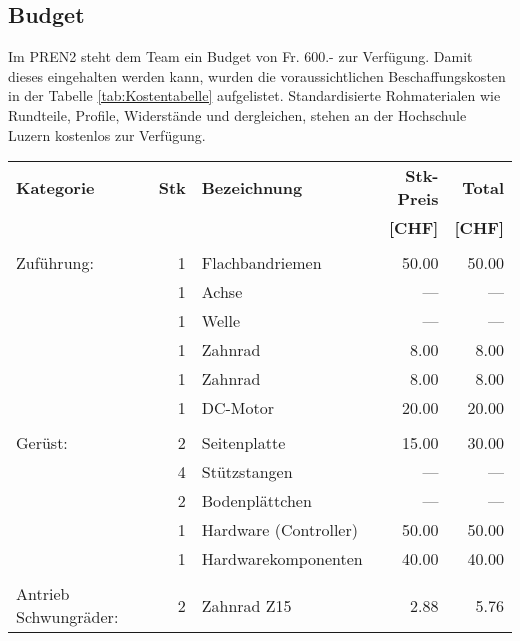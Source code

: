 \subsection{Budget}
    Im PREN2 steht dem Team ein Budget von Fr. 600.- zur Verfügung. Damit 
    dieses eingehalten werden kann, wurden die voraussichtlichen 
    Beschaffungskosten in der Tabelle \ref{tab:Kostentabelle} aufgelistet. 
    Standardisierte Rohmaterialen wie Rundteile, Profile, Widerstände und 
    dergleichen, stehen an der Hochschule Luzern kostenlos zur Verfügung.
    \begin{longtable}{p{1.7cm}rlrr}
    \textbf{Kategorie} & \textbf{Stk} & \textbf{Bezeichnung} & \textbf{Stk-Preis}
    & \textbf{Total} \\ & & & \textbf{[CHF]} & \textbf{[CHF]} \\       
    \hline     &       &                              &        &        \\
    Zuführung: & 1     & Flachbandriemen              &  50.00 &  50.00 \\
               & 1     & Achse                        &  {---} &  {---} \\
               & 1     & Welle                        &  {---} &  {---} \\
               & 1     & Zahnrad                      &   8.00 &   8.00 \\
               & 1     & Zahnrad                      &   8.00 &   8.00 \\
               & 1     & DC-Motor                     &  20.00 &  20.00 \\
               &       &                              &        &        \\
       Gerüst: & 2     & Seitenplatte                 &  15.00 &  30.00 \\
               & 4     & Stützstangen                 &  {---} &  {---} \\
               & 2     & Bodenplättchen               &  {---} &  {---} \\
               & 1     & Hardware (Controller)        &  50.00 &  50.00 \\
               & 1     & Hardwarekomponenten          &  40.00 &  40.00 \\
               &       &                              &        &        \\
   \multirow{2}{1.7cm}{Antrieb Schwungräder:}  
               & 2     & Zahnrad Z15                  &   2.88 &   5.76 \\

\end{longtable}
